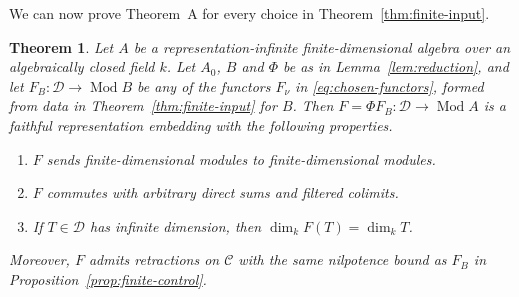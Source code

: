 \documentclass[a4paper,reqno,10pt]{amsart}
\newtheorem{theorem}{Theorem}[section]
\theoremstyle{definition}
\DeclareMathOperator{\Mod}{Mod}
\newcommand{\dm}{\dim_k}
\newcommand{\D}{\mathcal D}
\newcommand{\C}{\mathcal C}
\numberwithin{equation}{section}
\begin{document}
We can now prove Theorem~A for every choice in
Theorem~\ref{thm:finite-input}.
\begin{theorem}\label{thm:embedding}
Let $A$ be a representation-infinite finite-dimensional algebra over an
algebraically closed field $k$. Let $A_0$, $B$ and $\Phi$ be as in
Lemma~\ref{lem:reduction}, and let
$F_B:\D\to\Mod B$ be any of the functors $F_\nu$ in
\eqref{eq:chosen-functors}, formed from data in
Theorem~\ref{thm:finite-input} for $B$.
Then $F=\Phi F_B:\D\to\Mod A$ is a
faithful representation embedding with the following properties.
\begin{enumerate}
\item $F$ sends finite-dimensional modules to finite-dimensional modules.
\item $F$ commutes with arbitrary direct sums and filtered colimits.
\item If $T\in\D$ has infinite dimension, then $\dm F(T)=\dm T$.
\end{enumerate}
Moreover, $F$ admits retractions on $\C$ with the same nilpotence bound
as $F_B$ in Proposition~\ref{prop:finite-control}.
\end{theorem}
\end{document}
